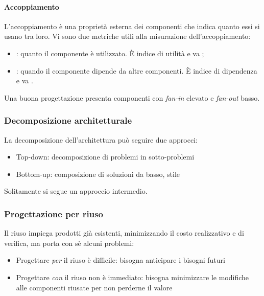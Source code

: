 \begin{itemize}
\paragraph{Accoppiamento}

L'accoppiamento è una proprietà esterna dei componenti che indica quanto essi si
usano tra loro. Vi sono due metriche utili alla misurazione dell'accoppiamento:

\begin{itemize}
  \item {}: quanto il componente è
        utilizzato. È indice di utilità e va ;
  \item {}: quando il componente
        dipende da altre componenti. È indice di dipendenza e va
        .
\end{itemize}

Una buona progettazione presenta componenti con \emph{fan-in} elevato e
\emph{fan-out} basso.

\subsubsection{Decomposizione architetturale}

La decomposizione dell'architettura può seguire due approcci:

\begin{itemize}
  \item Top-down: decomposizione di problemi in sotto-problemi
  \item Bottom-up: composizione di soluzioni da basso, stile 
\end{itemize}

Solitamente si segue un approccio intermedio.

\subsubsection{Progettazione per riuso}

Il riuso impiega prodotti già esistenti, minimizzando il costo realizzativo e di
verifica, ma porta con sè alcuni problemi:

\begin{itemize}
  \item Progettare \emph{per} il riuso è difficile: bisogna anticipare i bisogni
        futuri
  \item Progettare \emph{con} il riuso non è immediato: bisogna minimizzare le
        modifiche alle componenti riusate per non perderne il valore
\end{itemize}


\end{itemize}
